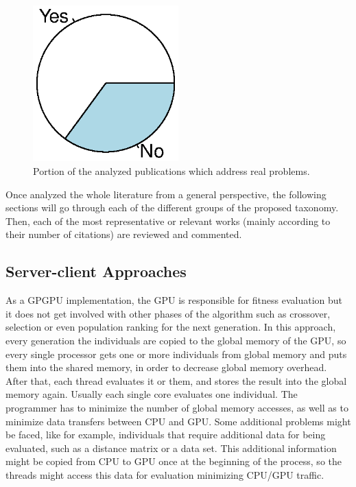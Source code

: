 \documentclass{article}
\begin{document}
\begin{figure}[!ht]
\centering
\includegraphics[clip,trim=16 64 16 64,width=0.5\textwidth]{realproblem.eps}
\caption{Portion of the analyzed publications which address real problems.}
\label{figure:type_problem}
\end{figure}


Once analyzed the whole literature from a general perspective, the following sections will go through each of the different groups of the proposed taxonomy. Then, each of the most representative or relevant works (mainly according to their number of citations) are reviewed and commented.


\subsection{Server-client Approaches}
\label{sec:serverClient}

As a GPGPU implementation, the GPU is responsible for fitness
evaluation but it does not get involved with other phases of the
algorithm such as crossover, selection or even population ranking for
the next generation. In this approach, every generation the
individuals are copied to the global memory of the GPU, so every
single processor gets one or more individuals from global memory and
puts them into the shared memory, in order to decrease global memory
overhead. After that, each thread evaluates it or them, and stores the
result into the global memory again. Usually each single core
evaluates one individual. The programmer has to minimize the number of
global memory accesses, as well as to minimize data transfers between
CPU and GPU. Some additional problems might be faced, like for
example, individuals that require additional data for being evaluated,
such as a distance matrix or a data set. This additional information
might be copied from CPU to GPU once at the beginning of the process,
so the threads might access this data for evaluation minimizing CPU/GPU
traffic.
\end{document}
